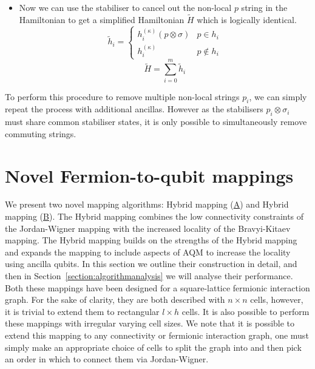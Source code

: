 \begin{itemize}
\begin{equation}
    \label{eq:equivalent_to_original_hamiltonian}
    H^{(\kappa)}\ket{\tilde \psi}_{SA} = V (H \otimes I) \ket{\psi}_S \ket{0}_A
\end{equation}
\item Now we can use the stabiliser to cancel out the non-local $p$ string in the Hamiltonian to get a simplified Hamiltonian $\tilde H$ which is logically identical.
\begin{equation}
   \tilde h_i = \begin{cases} h_i^{(\kappa)} (p \otimes \sigma)  &  p \in h_i \\ 
   h_i^{(\kappa)} & p \notin h_i \end{cases}
\end{equation}
\begin{equation}
    \tilde H = \sum_{i=0}^m \tilde h_i
\end{equation}
\end{itemize}
To perform this procedure to remove multiple non-local strings $p_i$, we can simply repeat the process with additional ancillas. However as the stabilisers $p_i \otimes \sigma_i$ must share common stabiliser states, it is only possible to simultaneously remove commuting strings. 

\section{Novel Fermion-to-qubit mappings}
We present two novel mapping algorithms: Hybrid mapping (\hyperref[section:Hybridmapping]{A}) and Hybrid\+ mapping (\hyperref[section:auxHybridmapping]{B}). The Hybrid mapping combines the low connectivity constraints of the Jordan-Wigner mapping with the increased locality of the Bravyi-Kitaev mapping. The Hybrid\+ mapping builds on the strengths of the Hybrid mapping and expands the mapping to include aspects of AQM \cite{Verstraete_2005, steudtner2019quantum} to increase the locality using ancilla qubits.
In this section we outline their construction in detail, and then in Section~\ref{section:algorithmanalysis} we will analyse their performance. 
Both these mappings have been designed for a square-lattice fermionic interaction graph. For the sake of clarity, they are both described with $n \times n$ cells, however, it is trivial to extend them to rectangular $l \times h$ cells. It is also possible to perform these mappings with irregular varying cell sizes. We note that it is possible to extend this mapping to any connectivity or fermionic interaction graph, one must simply make an appropriate choice of cells to split the graph into and then pick an order in which to connect them via Jordan-Wigner.
